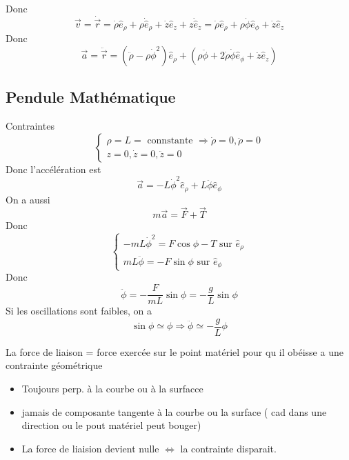\documentclass[../main.tex]{subfiles}
\begin{document}
Donc
\[ 
	\vec{v} = \dot{ \vec{r} } = \dot{\rho} \hat{e}_{\rho}  + \rho \dot{\hat{e}}_{\rho}  + \dot{z} \hat{e}_z + z \dot{ \hat{e} }_z = \dot{\rho} \hat{e}_{\rho}  + \rho \dot{\phi} \hat{e}_{\phi} + \dot{z} \hat{e}_{z} 
\]
Donc
\[ 
	\vec{a} = \ddot{\vec{r}} = ( \ddot{\rho} - \rho \dot{\phi}^{2}) \hat{e}_{\rho}  + ( \rho \ddot{\phi} + 2 \dot{\rho} \dot{\phi} \hat{e}_{\phi} + \ddot{z} \hat{e}_z)
\]
\subsection{Pendule Mathématique}
Contraintes
\[ 
\begin{cases}
	\rho = L = \text{ connstante } \Rightarrow  \dot{\rho}=0 , \ddot{\rho} = 0\\
	z=0, \dot{z} = 0, \ddot{z} = 0
\end{cases}
\]
Donc l'accélération est
\[ 
	\vec{a} = - L \dot{\phi} ^{2}\hat{e}_{\rho} + L \ddot{\phi} \hat{e}_{\phi} 
\]
On a aussi
\[ 
m \vec{a} = \vec{F} + \vec{T}
\]
Donc
\[ 
\begin{cases}
	-m L \dot{\phi} ^{2} = F \cos \phi -T \text{ sur  } \hat{e}_{\rho} \\
	m L \ddot{\phi} = -F \sin \phi \text{ sur  } \hat{e}_{\phi} 
\end{cases}
\]
Donc
\[ 
	\ddot{\phi} = - \frac{F}{mL} \sin \phi = - \frac{g}{L} \sin \phi
\]
Si les oscillations sont faibles, on a
\[ 
	\sin \phi \simeq \phi \Rightarrow \ddot{\phi} \simeq - \frac{g}{L}\phi
\]

\begin{thm}
La force de liaison = force exercée sur le point matériel pour qu il obéisse a une contrainte géométrique
\begin{itemize}
\item Toujours perp. à la courbe ou à la surfacce
\item jamais de composante tangente à la courbe ou la surface ( cad dans une direction ou le pout matériel peut bouger) 
\item La force de liaision devient nulle $\iff$ la contrainte disparait.
\end{itemize}

\end{thm}
\end{document}
